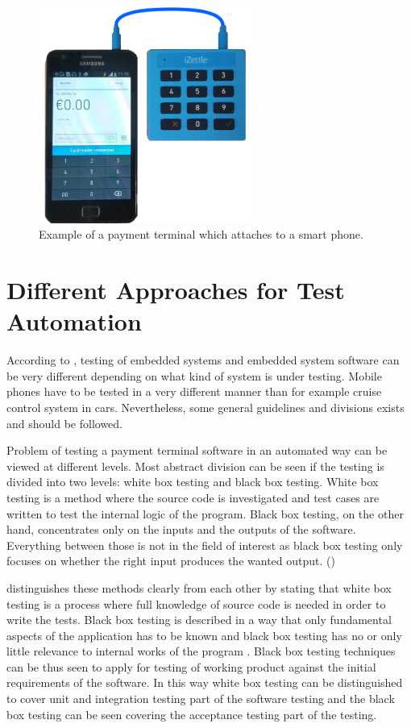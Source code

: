 \begin{figure}[ht]
  \begin{center}
    \includegraphics[width=7cm]{images/izettle.png}
    \caption{Example of a payment terminal which attaches to a smart phone.}
    \label{fig:izettle}
  \end{center}
\end{figure}

\section{Different Approaches for Test Automation}
\label{section:test automation approaches}

According to \emph{\cite{broekman2003testing}}, testing of embedded systems and embedded system software can be very different depending on what kind of system is under testing. Mobile phones have to be tested in a very different manner than for example cruise control system in cars. Nevertheless, some general guidelines and divisions exists and should be followed.

Problem of testing a payment terminal software in an automated way can be viewed at different levels. Most abstract division can be seen if the testing is divided into two levels: white box testing and black box testing. White box testing is a method where the source code is investigated and test cases are written to test the internal logic of the program. Black box testing, on the other hand, concentrates only on the inputs and the outputs of the software. Everything between those is not in the field of interest as black box testing only focuses on whether the right input produces the wanted output. (\emph{\cite{myers2011art}})

\emph{\cite{khan2012comparative}} distinguishes these methods clearly from each other by stating that white box testing is a process where full knowledge of source code is needed in order to write the tests. Black box testing is described in a way that only fundamental aspects of the application has to be known and black box testing has no or only little relevance to internal works of the program \emph{\citep{pressman2005software}}. Black box testing techniques can be thus seen to apply for testing of working product against the initial requirements of the software. In this way white box testing can be distinguished to cover unit and integration testing part of the software testing and the black box testing can be seen covering the acceptance testing part of the testing.

